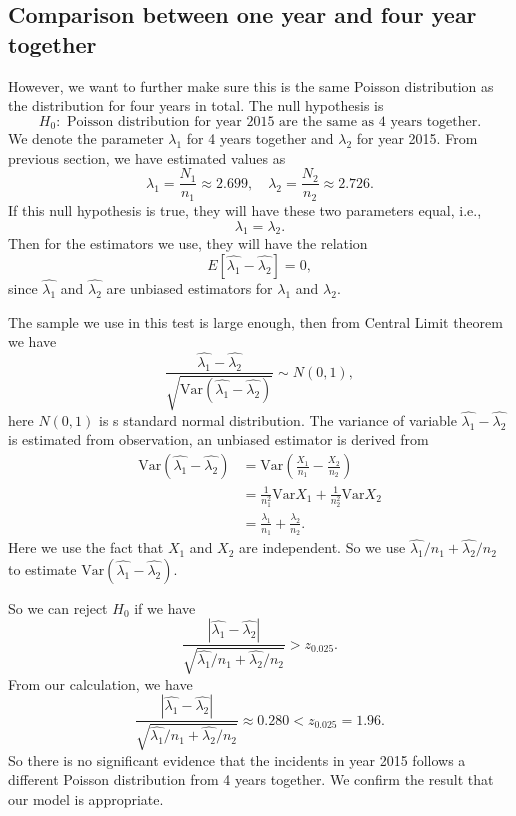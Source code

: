 \documentclass[11pt,a4paper,english]{article}
\begin{document}
\subsection{Comparison between one year and four year together}
However, we want to further make sure this is the same Poisson distribution as the distribution for four years in total. The null hypothesis is 
\[H_{0}:\text{ Poisson distribution for year 2015 are the same as 4 years together.}\]
We denote the parameter $\lambda_{1}$ for 4 years together and $\lambda_{2}$ for year 2015. From previous section, we have estimated values as
\[\lambda_{1} = \frac{N_{1}}{n_{1}} \approx 2.699,\quad \lambda_{2} = \frac{N_{2}}{n_{2}} \approx 2.726.\]
If this null hypothesis is true, they will have these two parameters equal, i.e.,
\begin{equation*}
	\lambda_{1} = \lambda_{2}.
\end{equation*}
Then for the estimators we use, they will have the relation
\begin{equation*}
	E[\hat{\lambda_{1}}-\hat{\lambda_{2}}] = 0,
\end{equation*}
since $\hat{\lambda_{1}}$ and $\hat{\lambda_{2}}$ are unbiased estimators for $\lambda_{1}$ and $\lambda_{2}$.

The sample we use in this test is large enough, then from Central Limit theorem \cite{slides} we have
\begin{equation*}
	\frac{\hat{\lambda_{1}} - \hat{\lambda_{2}}}{\sqrt{\text{Var}\left(\hat{\lambda_{1}} - \hat{\lambda_{2}}\right)}}
	\sim N(0, 1),
\end{equation*}
here $N(0,1)$ is s standard normal distribution.
The variance of variable $\hat{\lambda_{1}}-\hat{\lambda_{2}}$ is estimated from observation, an unbiased estimator is derived from
\begin{align*}
	\text{Var}\left(\hat{\lambda_{1}} - \hat{\lambda_{2}}\right)
	&= \text{Var}\left(\frac{X_{1}}{n_{1}} - \frac{X_{2}}{n_{2}}\right) \\
	&= \frac{1}{n_{1}^{2}}\text{Var} X_{1}
	+ \frac{1}{n_{2}^{2}}\text{Var} X_{2} \\
	&= \frac{\lambda_{1}}{n_{1}} + \frac{\lambda_{2}}{n_{2}}.
\end{align*}
Here we use the fact that $X_{1}$ and $X_{2}$ are independent. So we use $\hat{\lambda_{1}}/{n_{1}} + \hat{\lambda_{2}}/{n_{2}}$ to estimate $\text{Var}\left(\hat{\lambda_{1}}-\hat{\lambda_{2}}\right)$.

So we can reject $H_{0}$ if we have 
\[\frac{|\hat{\lambda_{1}}-\hat{\lambda_{2}}|}{\sqrt{\hat{\lambda_{1}}/{n_{1}} + \hat{\lambda_{2}}/{n_{2}}}} > z_{0.025}.\]
From our calculation, we have 
\begin{equation*}
	\frac{|\hat{\lambda_{1}}-\hat{\lambda_{2}}|}{\sqrt{\hat{\lambda_{1}}/{n_{1}} + \hat{\lambda_{2}}/{n_{2}}}} \approx 0.280 < z_{0.025} = 1.96.
\end{equation*}
So there is no significant evidence that the incidents in year 2015 follows a different Poisson distribution from 4 years together. We confirm the result that our model is appropriate.
\end{document}
